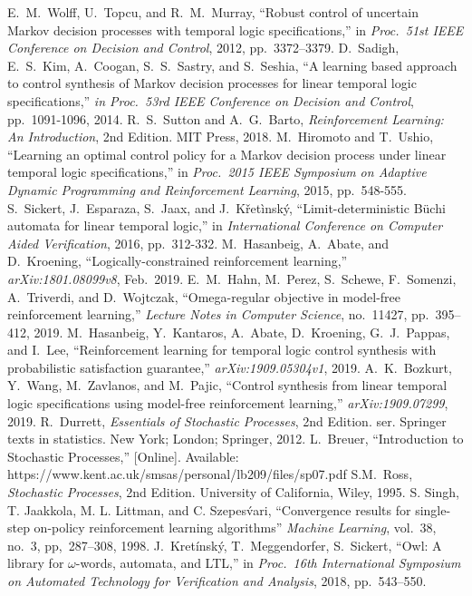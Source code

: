 \documentclass[letterpaper, 10 pt, conference]{ieeeconf}  %
\begin{document}
\begin{thebibliography}{99}
E.\ M.\ Wolff, U.\ Topcu, and R.\ M.\ Murray,
``Robust control of uncertain Markov decision processes with temporal logic specifications,''
in \textit{Proc.\ 51st IEEE Conference on Decision and Control}, 2012, pp.\ 3372--3379.
D.\ Sadigh, E.\ S.\ Kim, A.\ Coogan, S.\ S.\ Sastry, and S.\ Seshia,
``A learning based approach to control synthesis of Markov decision processes for linear temporal logic specifications,''
\textit{in Proc.\ 53rd IEEE Conference on Decision and Control}, pp.\ 1091-1096, 2014.
R.\ S.\ Sutton and A.\ G.\ Barto,
\textit{Reinforcement Learning: An Introduction}, 2nd Edition.
MIT Press, 2018.
M.\ Hiromoto and T.\ Ushio,
``Learning an optimal control policy for a Markov decision process under linear temporal logic specifications,''
in \textit{Proc.\ 2015 IEEE Symposium on Adaptive Dynamic Programming and Reinforcement Learning}, 2015, pp.\ 548-555.
S.\ Sickert, J.\ Esparaza, S.\ Jaax, and J.\ K\v{r}et\`{i}nsk\'{y},
``Limit-deterministic B\"{u}chi automata for linear temporal logic,''
 in \textit{International Conference on Computer Aided Verification}, 2016, pp.\ 312-332.
M.\ Hasanbeig, A.\ Abate, and D.\ Kroening,
``Logically-constrained reinforcement learning,'' \textit{arXiv:1801.08099v8}, Feb.\ 2019.
E.\ M.\ Hahn, M.\ Perez, S.\ Schewe, F.\ Somenzi, A.\ Triverdi, and D.\ Wojtczak,
``Omega-regular objective in model-free reinforcement learning,''
\textit{Lecture Notes in Computer Science}, no.\ 11427, pp.\ 395--412, 2019.
M.\ Hasanbeig, Y.\ Kantaros, A.\ Abate, D.\ Kroening, G.\ J.\ Pappas, and I.\ Lee,
``Reinforcement learning for temporal logic control synthesis with probabilistic satisfaction guarantee,''
\textit{arXiv:1909.05304v1}, 2019.
A.\ K.\ Bozkurt, Y.\ Wang, M.\ Zavlanos, and M.\ Pajic,
``Control synthesis from linear temporal logic specifications using model-free reinforcement learning,''
\textit{arXiv:1909.07299}, 2019.
R.\ Durrett,
\textit{Essentials of Stochastic Processes}, 2nd Edition. ser. Springer texts in statistics. New York; London; Springer, 2012.
L.\ Breuer,
``Introduction to Stochastic Processes,'' [Online]. Available: https://www.kent.ac.uk/smsas/personal/lb209/files/sp07.pdf
S.M.\ Ross,
\textit{Stochastic Processes}, 2nd Edition. University of California, Wiley, 1995.
S. Singh, T. Jaakkola, M. L. Littman, and C. Szepes\'{v}ari,
``Convergence results for single-step on-policy reinforcement learning algorithms'' \textit{Machine Learning},
vol.~38, no.~3, pp,~287--308, 1998.
J.~Kretínsk\'{y}, T.~Meggendorfer, S.~Sickert, ``Owl: A library for $\omega$-words, automata,
and LTL,'' in \textit{Proc.~16th International Symposium on Automated Technology for Verification and Analysis}, 2018,  pp.~543–550.

\end{thebibliography}
\end{document}
